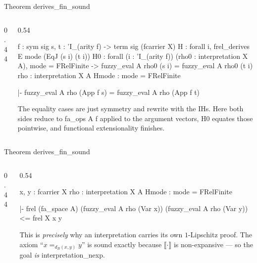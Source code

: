 \documentclass[10pt,aspectratio=169]{beamer}
\newcommand{\qeq}[1]{=_{#1}}
\newcommand{\den}[1]{\llbracket #1 \rrbracket}
\newcommand{\rid}[1]{{\ttfamily\small #1}}
\begin{document}
\begin{frame}[fragile]{Theorem \rid{derives\_fin\_sound}}
  \begin{columns}[T]
  \begin{column}{0.44\textwidth}\end{column}
  \begin{column}{0.54\textwidth}
    \begin{goalbox}[title={Goal 5 / 12 \quad (FD\_EqCong)}]
\begin{gctx}
f : sym sig
s, t : 'I_(arity f) -> term sig (fcarrier X)
H : forall i, frel_derives E mode (EqJ (s i) (t i))
H0 : forall (i : 'I_(arity f)) (rho0 : interpretation X A),
     mode = FRelFinite ->
     fuzzy_eval A rho0 (s i) = fuzzy_eval A rho0 (t i)
rho : interpretation X A
Hmode : mode = FRelFinite
\end{gctx}
\tcblower
\begin{gconc}
|- fuzzy_eval A rho (App f s) = fuzzy_eval A rho (App f t)
\end{gconc}
    \end{goalbox}
    \smallskip
    {\footnotesize The equality cases are just \rid{symmetry} and
    \rid{rewrite} with the IHs. Here both sides reduce to
    \rid{fa\_ops A f} applied to the argument vectors, \rid{H0} equates
    those pointwise, and functional extensionality finishes.}
  \end{column}
  \end{columns}
\end{frame}

\begin{frame}[fragile]{Theorem \rid{derives\_fin\_sound}}
  \begin{columns}[T]
  \begin{column}{0.44\textwidth}\end{column}
  \begin{column}{0.54\textwidth}
    \begin{goalbox}[title={Goal 6 / 12 \quad (FD\_UseVariables)}]
\begin{gctx}
x, y : fcarrier X
rho : interpretation X A
Hmode : mode = FRelFinite
\end{gctx}
\tcblower
\begin{gconc}
|- frel (fa_space A) (fuzzy_eval A rho (Var x))
                     (fuzzy_eval A rho (Var y))
   <= frel X x y
\end{gconc}
    \end{goalbox}
    \smallskip
    {\footnotesize This is \emph{precisely} why an \rid{interpretation}
    carries its own $1$-Lipschitz proof. The axiom
    ``$x \qeq{d_B(x,y)} y$'' is sound exactly because $\den{\cdot}$ is
    non-expansive --- so the goal \emph{is} \rid{interpretation\_nexp}.}
  \end{column}
  \end{columns}
\end{frame}
\end{document}
